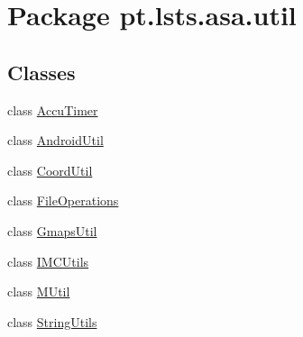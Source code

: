 \hypertarget{namespacept_1_1lsts_1_1asa_1_1util}{}\section{Package pt.\+lsts.\+asa.\+util}
\label{namespacept_1_1lsts_1_1asa_1_1util}
\subsection*{Classes}
\begin{DoxyCompactItemize}
\item 
class \hyperlink{classpt_1_1lsts_1_1asa_1_1util_1_1AccuTimer}{Accu\+Timer}
\item 
class \hyperlink{classpt_1_1lsts_1_1asa_1_1util_1_1AndroidUtil}{Android\+Util}
\item 
class \hyperlink{classpt_1_1lsts_1_1asa_1_1util_1_1CoordUtil}{Coord\+Util}
\item 
class \hyperlink{classpt_1_1lsts_1_1asa_1_1util_1_1FileOperations}{File\+Operations}
\item 
class \hyperlink{classpt_1_1lsts_1_1asa_1_1util_1_1GmapsUtil}{Gmaps\+Util}
\item 
class \hyperlink{classpt_1_1lsts_1_1asa_1_1util_1_1IMCUtils}{I\+M\+C\+Utils}
\item 
class \hyperlink{classpt_1_1lsts_1_1asa_1_1util_1_1MUtil}{M\+Util}
\item 
class \hyperlink{classpt_1_1lsts_1_1asa_1_1util_1_1StringUtils}{String\+Utils}
\end{DoxyCompactItemize}
